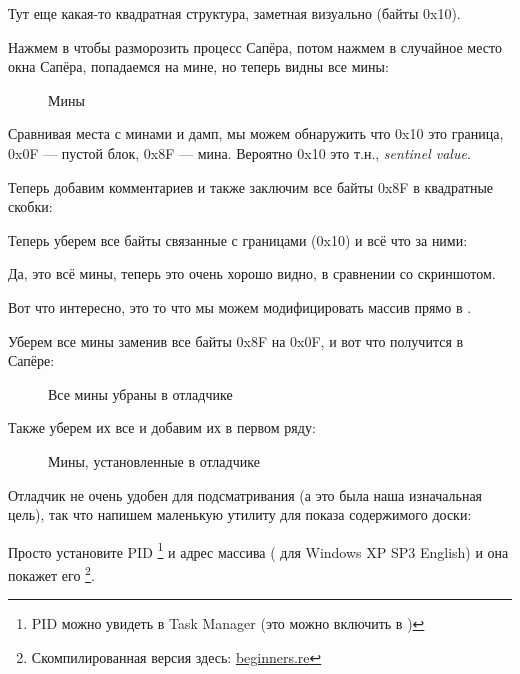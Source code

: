 Тут еще какая-то квадратная структура, заметная визуально (байты 0x10).

Нажмем  в \olly чтобы разморозить процесс Сапёра, потом нажмем в случайное место окна Сапёра, попадаемся на мине, но теперь
видны все мины:

\begin{figure}[H]
\centering
{}
\caption{Мины}
\label{fig:minesweeper1}
\end{figure}

Сравнивая места с минами и дамп, мы можем обнаружить что 0x10 это граница, 0x0F --- пустой блок, 
0x8F --- мина.
Вероятно 0x10 это т.н., \emph{sentinel value}.

Теперь добавим комментариев и также заключим все байты 0x8F в квадратные скобки:%



Теперь уберем все байты связанные с границами (0x10) и всё что за ними:%



Да, это всё мины, теперь это очень хорошо видно, в сравнении со скриншотом.

\clearpage
Вот что интересно, это то что мы можем модифицировать массив прямо в \olly.%

Уберем все мины заменив все байты 0x8F на 0x0F, и вот что получится в Сапёре:

\begin{figure}[H]
\centering
{}
\caption{Все мины убраны в отладчике}
\label{fig:minesweeper3}
\end{figure}

Также уберем их все и добавим их в первом ряду: 

\begin{figure}[H]
\centering
{}
\caption{Мины, установленные в отладчике}
\label{fig:minesweeper2}
\end{figure}

Отладчик не очень удобен для подсматривания (а это была наша изначальная цель), так что напишем маленькую
утилиту для показа содержимого доски:



Просто установите \ac{PID}
\footnote{PID можно увидеть в Task Manager 
(это можно включить в )} 
и адрес массива ( для Windows XP SP3 English) 
и она покажет его
\footnote{Скомпилированная версия здесь: 
\href{http://beginners.re/examples/minesweeper_WinXP/minesweeper_cheater.exe}{beginners.re}}.

